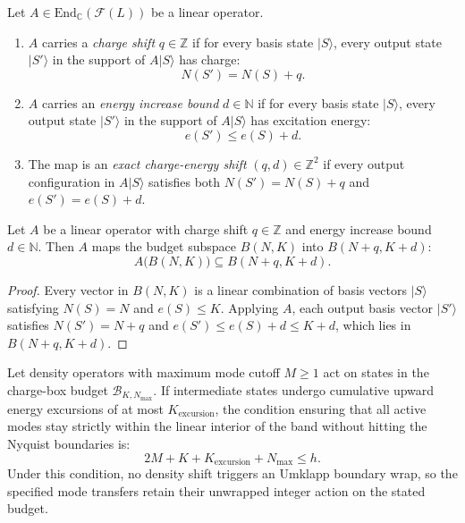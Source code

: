 \begin{definition}
Let $A \in \mathrm{End}_{\mathbb{C}}(\mathcal{F}(L))$ be a linear operator.
\begin{enumerate}
    \item $A$ carries a \emph{charge shift} $q \in \mathbb{Z}$ if for every basis state $|S\rangle$, every output state $|S'\rangle$ in the support of $A |S\rangle$ has charge:
    \begin{equation}
    N(S') = N(S) + q.
    \end{equation}
    \item $A$ carries an \emph{energy increase bound} $d \in \mathbb{N}$ if for every basis state $|S\rangle$, every output state $|S'\rangle$ in the support of $A |S\rangle$ has excitation energy:
    \begin{equation}
    e(S') \le e(S) + d.
    \end{equation}
    \item The map is an \emph{exact charge-energy shift} $(q,d)\in\mathbb Z^2$ if every output configuration in $A|S\rangle$ satisfies both $N(S')=N(S)+q$ and $e(S')=e(S)+d$.
\end{enumerate}
\end{definition}

\begin{theorem}
\label{thm:filtered_action}
Let $A$ be a linear operator with charge shift $q \in \mathbb{Z}$ and energy increase bound $d \in \mathbb{N}$.
Then $A$ maps the budget subspace $B(N, K)$ into $B(N+q, K+d)$:
\begin{equation}
A\big( B(N, K) \big) \subseteq B(N+q, K+d).
\end{equation}
\end{theorem}

\begin{proof}
Every vector in $B(N, K)$ is a linear combination of basis vectors $|S\rangle$ satisfying $N(S) = N$ and $e(S) \le K$. Applying $A$, each output basis vector $|S'\rangle$ satisfies $N(S') = N + q$ and $e(S') \le e(S) + d \le K + d$, which lies in $B(N+q, K+d)$.
\end{proof}

\begin{theorem}
\label{thm:unified_margin}
Let density operators with maximum mode cutoff $M \ge 1$ act on states in the charge-box budget $\mathcal{B}_{K, N_{\max}}$. If intermediate states undergo cumulative upward energy excursions of at most $K_{\mathrm{excursion}}$, the condition ensuring that all active modes stay strictly within the linear interior of the band without hitting the Nyquist boundaries is:
\begin{equation}
2M + K + K_{\mathrm{excursion}} + N_{\max} \le h.
\end{equation}
Under this condition, no density shift triggers an Umklapp boundary wrap, so the specified mode transfers retain their unwrapped integer action on the stated budget.
\end{theorem}

